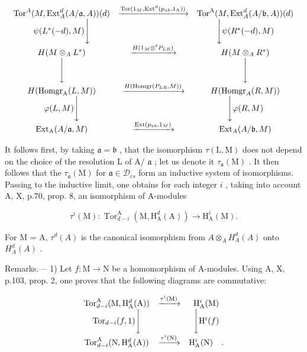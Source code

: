\[
\begin{array}{c c c} \operatorname{Tor} ^ {A} (M, \operatorname{Ext} _ {A} ^ {d} (A / \mathfrak {a}, A)) (d) & \xrightarrow {\operatorname{Tor} (1 _ {M} , \operatorname{Ext} ^ {d} (p _ {a b} , 1 _ {\mathrm{A}}))} & \operatorname{Tor} ^ {\mathrm{A}} (M, \operatorname{Ext} _ {A} ^ {d} (A / \mathfrak {b}, A)) (d) \\ \psi (L ^ {*} (- d), M) \Bigg \downarrow & & \Bigg \downarrow \psi (R ^ {*} (- d), M) \\ H (M \otimes_ {A} L ^ {*}) & \xrightarrow {H (1 _ {M} \otimes^ {t} P _ {L R})} & H (M \otimes_ {A} R ^ {*}) \\ \Bigg \downarrow & & \Bigg \downarrow \\ H (\operatorname{Homgr} _ {\mathrm{A}} (L, M)) & \xrightarrow {H (\operatorname{Homgr} (P _ {L R} , M))} & H (\operatorname{Homgr} _ {A} (R, M)) \\ \varphi (L, M) \Bigg \downarrow & & \Bigg \downarrow \varphi (R, M) \\ \operatorname{Ext} _ {\mathrm{A}} (A / \mathfrak {a}, M) & \xrightarrow {\operatorname{Ext} (p _ {a b} , 1 _ {M})} & \operatorname{Ext} _ {A} (A / \mathfrak {b}, M) \end{array}
\]

It follows first, by taking \(\mathfrak{a} = \mathfrak{b}\) , that the isomorphism \(\tau(\mathrm{L},\mathrm{M})\) does not depend on the choice of the resolution L of A/ \(\mathfrak{a}\) ; let us denote it \(\tau_{\mathfrak{a}}(\mathrm{M})\) . It then follows that the \(\tau_{\mathfrak{a}}(\mathrm{M})\) for \(\mathfrak{a} \in \mathcal{D}_{cs}\) form an inductive system of isomorphisms. Passing to the inductive limit, one obtains for each integer \(i\) , taking into account A, X, p.70, prop. 8, an isomorphism of A-modules

\[
\tau^ {i} (\mathrm{M}): \operatorname{Tor} _ {d - i} ^ {\mathrm{A}} (\mathrm{M}, \mathrm{H} _ {\mathrm{A}} ^ {d} (\mathrm{A})) \longrightarrow \mathrm{H} _ {\mathrm{A}} ^ {i} (\mathrm{M}).
\]

For M = A, \(\tau^{d}(A)\) is the canonical isomorphism from \(A \otimes_{A} H_{A}^{d}(A)\) onto \(H_{A}^{d}(A)\) .

Remarks.--- 1) Let \(f: \mathrm{M} \to \mathrm{N}\) be a homomorphism of A-modules. Using A, X, p.103, prop. 2, one proves that the following diagrams are commutative:

\[
\begin{array}{c c c} \operatorname{Tor} _ {d - i} ^ {\mathrm{A}} (\mathrm{M}, \mathrm{H} _ {\mathrm{A}} ^ {d} (\mathrm{A})) & \xrightarrow {\tau^ {i} (\mathrm{M})} & \mathrm{H} _ {\mathrm{A}} ^ {i} (\mathrm{M}) \\ \operatorname{Tor} _ {d - i} (f, 1) \Bigg \downarrow & & \Bigg \downarrow \mathrm{H} ^ {i} (f) \\ \operatorname{Tor} _ {d - i} ^ {\mathrm{A}} (\mathrm{N}, \mathrm{H} _ {\mathrm{A}} ^ {d} (\mathrm{A})) & \xrightarrow {\tau^ {i} (\mathrm{N})} & \mathrm{H} _ {\mathrm{A}} ^ {i} (\mathrm{N}) \quad . \end{array}
\]

